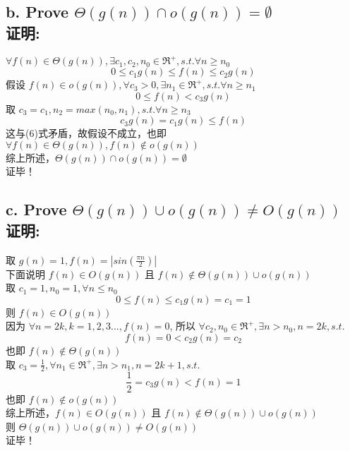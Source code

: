 \documentclass[12pt]{article}
\begin{document}
    \subsection*{b. Prove $ \Theta(g(n)) \cap o(g(n))=\emptyset $ \\\textbf{证明:}}
      $ \forall f(n) \in \Theta(g(n)), \exists c_1, c_2, n_0 \in \Re^+, s.t. \forall n \geq n_0 $
      \begin{equation}
        0 \leq c_1g(n) \leq f(n) \leq c_2g(n)
      \end{equation}
      假设 $ f(n) \in o(g(n)), \forall c_3 > 0, \exists n_1 \in \Re^+, s.t. \forall n \geq n_1 $
      \begin{equation}
        0 \leq f(n) < c_3g(n)
      \end{equation}
      取 $ c_3=c_1, n_2=max(n_0,n_1), s.t. \forall n \geq n_3 $
      \begin{equation}
        c_3g(n)=c_1g(n) \leq f(n)
      \end{equation}
      这与(6)式矛盾，故假设不成立，也即 $ \forall f(n) \in \Theta(g(n)), f(n) \notin o(g(n)) $\\
      综上所述，$ \Theta(g(n)) \cap o(g(n))=\emptyset $\\
      证毕！
    \subsection*{c. Prove $ \Theta(g(n)) \cup o(g(n)) \neq O(g(n)) $ \\\textbf{证明:}}
      取 $ g(n)=1, f(n)=\left|sin\left(\frac{\pi n}{2}\right)\right| $\\
      下面说明 $ f(n) \in O(g(n)) $ 且 $ f(n) \notin \Theta(g(n)) \cup o(g(n)) $\\
      取 $ c_1=1, n_0=1, \forall n \leq n_0 $
      \begin{equation}
        0 \leq f(n) \leq c_1g(n) = c_1 = 1
      \end{equation}
      则 $ f(n) \in O(g(n)) $\\
      因为 $ \forall n=2k, k=1,2,3..., f(n)=0 $, 所以 $ \forall c_2, n_0 \in \Re^+, \exists n>n_0, n=2k, s.t.$
      \begin{equation}
        f(n)=0<c_2g(n)=c_2
      \end{equation}
      也即 $ f(n) \notin \Theta(g(n)) $\\
      取 $ c_3=\frac{1}{2}, \forall n_1 \in \Re^+, \exists n>n_1, n=2k+1, s.t. $
      \begin{equation}
        \frac{1}{2} = c_3g(n) < f(n) = 1
      \end{equation}
      也即 $ f(n) \notin o(g(n)) $\\
      综上所述，$ f(n) \in O(g(n)) $ 且 $ f(n) \notin \Theta(g(n)) \cup o(g(n)) $\\
      则 $ \Theta(g(n)) \cup o(g(n)) \neq O(g(n)) $\\
      证毕！
\end{document}
